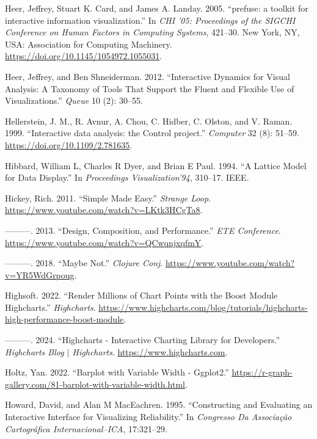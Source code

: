 \documentclass[
]{book}
\newlength{\cslhangindent}
\newenvironment{CSLReferences}[2] %
 {\begin{list}{}{%
  \setlength{\itemindent}{0pt}
  \setlength{\leftmargin}{0pt}
  \setlength{\parsep}{0pt}
  \ifodd #1
   \setlength{\leftmargin}{\cslhangindent}
   \setlength{\itemindent}{-1\cslhangindent}
  \fi
  \setlength{\itemsep}{#2\baselineskip}}}
 {\end{list}}
\theoremstyle{definition}
\theoremstyle{definition}
\theoremstyle{definition}
\theoremstyle{definition}
\theoremstyle{remark}
\begin{document}
\begin{CSLReferences}{1}{0}
Heer, Jeffrey, Stuart K. Card, and James A. Landay. 2005. {``{prefuse: a toolkit for interactive information visualization}.''} In \emph{{CHI '05: Proceedings of the SIGCHI Conference on Human Factors in Computing Systems}}, 421--30. New York, NY, USA: Association for Computing Machinery. \url{https://doi.org/10.1145/1054972.1055031}.

Heer, Jeffrey, and Ben Shneiderman. 2012. {``Interactive Dynamics for Visual Analysis: A Taxonomy of Tools That Support the Fluent and Flexible Use of Visualizations.''} \emph{Queue} 10 (2): 30--55.

Hellerstein, J. M., R. Avnur, A. Chou, C. Hidber, C. Olston, and V. Raman. 1999. {``{Interactive data analysis: the Control project}.''} \emph{Computer} 32 (8): 51--59. \url{https://doi.org/10.1109/2.781635}.

Hibbard, William L, Charles R Dyer, and Brian E Paul. 1994. {``A Lattice Model for Data Display.''} In \emph{Proceedings Visualization'94}, 310--17. IEEE.

Hickey, Rich. 2011. {``Simple Made Easy.''} \emph{Strange Loop}. \url{https://www.youtube.com/watch?v=LKtk3HCgTa8}.

---------. 2013. {``Design, Composition, and Performance.''} \emph{ETE Conference}. \url{https://www.youtube.com/watch?v=QCwqnjxqfmY}.

---------. 2018. {``Maybe Not.''} \emph{Clojure Conj}. \url{https://www.youtube.com/watch?v=YR5WdGrpoug}.

Highsoft. 2022. {``Render Millions of Chart Points with the Boost Module {\textendash} Highcharts.''} \emph{Highcharts}. \url{https://www.highcharts.com/blog/tutorials/highcharts-high-performance-boost-module}.

---------. 2024. {``Highcharts - Interactive Charting Library for Developers.''} \emph{Highcharts Blog {\(\vert\)} Highcharts}. \url{https://www.highcharts.com}.

Holtz, Yan. 2022. {``Barplot with Variable Width - Ggplot2.''} \url{https://r-graph-gallery.com/81-barplot-with-variable-width.html}.

Howard, David, and Alan M MacEachren. 1995. {``Constructing and Evaluating an Interactive Interface for Visualizing Reliability.''} In \emph{Congresso Da Associa{ç}{ã}o Cartogr{á}fica Internacional--ICA}, 17:321--29.


\end{CSLReferences}
\end{document}
